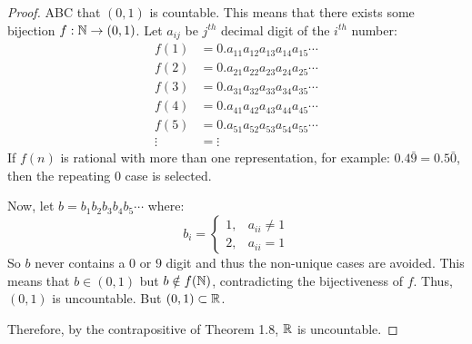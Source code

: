 \documentclass[letterpaper,12pt,fleqn]{article}
\begin{document}
\begin{proof}
  ABC that \((0,1)\) is countable.  This means that there exists some bijection \(f:\mathbb{N}\to(0,1)\).  Let \(a_{ij}\)
  be \(j^{th}\) decimal digit of the \(i^{th}\) number:
  \begin{align*}
    f(1) &= 0.a_{11}a_{12}a_{13}a_{14}a_{15}\cdots \\
    f(2) &= 0.a_{21}a_{22}a_{23}a_{24}a_{25}\cdots \\
    f(3) &= 0.a_{31}a_{32}a_{33}a_{34}a_{35}\cdots \\
    f(4) &= 0.a_{41}a_{42}a_{43}a_{44}a_{45}\cdots \\
    f(5) &= 0.a_{51}a_{52}a_{53}a_{54}a_{55}\cdots \\
    \vdots &= \vdots
  \end{align*}
  If \(f(n)\) is rational with more than one representation, for example: \(0.4\bar{9}=0.5\bar{0}\), then the
  repeating \(0\) case is selected.

  Now, let \(b=b_1b_2b_3b_4b_5\cdots\) where:
  \[b_i=\begin{cases}
  1, & a_{ii}\ne1 \\
  2, & a_{ii}=1
  \end{cases}\]
  So \(b\) never contains a \(0\) or \(9\) digit and thus the non-unique cases are avoided.  This means that
  \(b\in(0,1)\) but \(b\notin f(\mathbb{N})\), contradicting the bijectiveness of \(f\).  Thus, \((0,1)\) is uncountable.
  But \((0,1)\subset\mathbb{R}\).

  Therefore, by the contrapositive of Theorem 1.8, \(\mathbb{R}\) is uncountable.
\end{proof}
\end{document}
